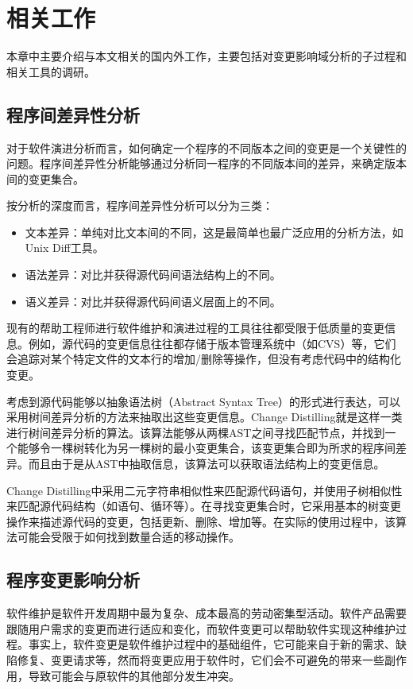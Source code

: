 \chapter{相关工作}

本章中主要介绍与本文相关的国内外工作，主要包括对变更影响域分析的子过程和相关工具的调研。
\section{程序间差异性分析}
\label{relate_diff}

对于软件演进分析而言，如何确定一个程序的不同版本之间的变更是一个关键性的问题\cite{kim2013identifying}。程序间差异性分析能够通过分析同一程序的不同版本间的差异，来确定版本间的变更集合\cite{lahiri2010differential,winstead2003towards}。

按分析的深度而言，程序间差异性分析可以分为三类：
\begin{itemize}
	\item 文本差异：单纯对比文本间的不同，这是最简单也最广泛应用的分析方法，如Unix Diff工具。
	\item 语法差异：对比并获得源代码间语法结构上的不同。
	\item 语义差异：对比并获得源代码间语义层面上的不同。
\end{itemize}

现有的帮助工程师进行软件维护和演进过程的工具往往都受限于低质量的变更信息。例如，源代码的变更信息往往都存储于版本管理系统中（如CVS）等，它们会追踪对某个特定文件的文本行的增加/删除等操作，但没有考虑代码中的结构化变更。

考虑到源代码能够以抽象语法树（Abstract Syntax Tree）的形式进行表达，可以采用树间差异分析的方法来抽取出这些变更信息。Change Distilling就是这样一类进行树间差异分析的算法\cite{fluri2007change,gall2009change}。该算法能够从两棵AST之间寻找匹配节点，并找到一个能够令一棵树转化为另一棵树的最小变更集合，该变更集合即为所求的程序间差异。而且由于是从AST中抽取信息，该算法可以获取语法结构上的变更信息。

Change Distilling中采用二元字符串相似性来匹配源代码语句，并使用子树相似性来匹配源代码结构（如语句、循环等）。在寻找变更集合时，它采用基本的树变更操作来描述源代码的变更，包括更新、删除、增加等。在实际的使用过程中，该算法可能会受限于如何找到数量合适的移动操作。

\section{程序变更影响分析}
\label{relate_impact}
软件维护是软件开发周期中最为复杂、成本最高的劳动密集型活动。软件产品需要跟随用户需求的变更而进行适应和变化，而软件变更可以帮助软件实现这种维护过程。事实上，软件变更是软件维护过程中的基础组件，它可能来自于新的需求、缺陷修复、变更请求等，然而将变更应用于软件时，它们会不可避免的带来一些副作用，导致可能会与原软件的其他部分发生冲突。

